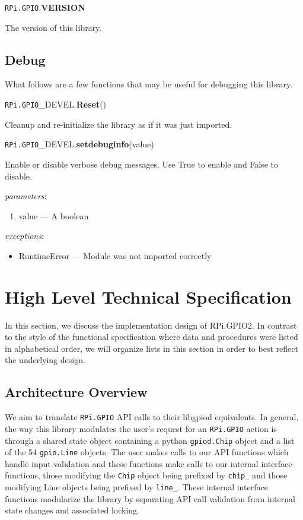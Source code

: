 \documentclass[12pt]{article}
\begin{document}
\noindent \texttt{RPi.GPIO}.\textbf{VERSION}

The version of this library.

\medskip \medskip

\subsection{Debug}

What follows are a few functions that may be useful for debugging this library.

\noindent \texttt{RPi.GPIO}\_DEVEL.\textbf{Reset}()
        
Cleanup and re-initialize the library as if it was just imported.

\noindent \texttt{RPi.GPIO}\_DEVEL.\textbf{setdebuginfo}(value)
        
Enable or disable verbose debug messages. Use True to enable and False to disable.

\textit{parameters}:
\begin{enumerate}      
        \item value --- A boolean
\end{enumerate}
 

\textit{exceptions}:
\begin{itemize}
    \item RuntimeError --- Module was not imported correctly 
\end{itemize}

\section{High Level Technical Specification}

In this section, we discuss the implementation design of RPi.GPIO2. In contrast to the style of the functional specification where data and procedures were listed in alphabetical order, we will organize lists in this section in order to best reflect the underlying design.

\subsection{Architecture Overview}

We aim to translate \texttt{RPi.GPIO} API calls to their libgpiod equivalents. In general, the way this library modulates the user's request for an \texttt{RPi.GPIO} action is through a shared state object containing a python \texttt{gpiod.Chip} object and a list of the 54 \texttt{gpio.Line} objects. The user makes calls to our API functions which handle input validation and these functions make calls to our internal interface functions, those modifying the \texttt{Chip} object being prefixed by \texttt{chip\_} and those modifying Line objects being prefixed by \texttt{line\_}. These internal interface functions modularize the library by separating API call validation from internal state changes and associated locking.
\end{document}
